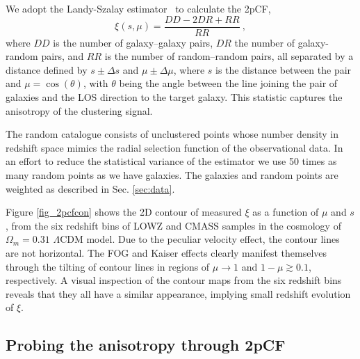 \documentclass[iop]{emulateapj}
\begin{document}
We adopt the Landy-Szalay estimator~\citep{1993ApJ...412...64L} to calculate the 2pCF,
\begin{equation}
\xi(s,\mu)=\frac{DD-2DR+RR}{RR}\ ,
\end{equation}
where $DD$ is the number of galaxy--galaxy pairs, 
$DR$ the number of galaxy-random pairs, 
and $RR$ is the number of random--random pairs, 
all separated by a distance defined by $s\pm\Delta s$ and $\mu\pm\Delta\mu$, 
where $s$ is the distance between the pair and $\mu=\cos(\theta)$, 
with $\theta$ being the angle between the line joining the pair of galaxies and the LOS direction to the target galaxy. 
This statistic captures the anisotropy of the clustering signal.

The random catalogue consists of unclustered points whose number density in redshift space mimics the radial selection function of the observational data. 
In an effort to reduce the statistical variance of the estimator we use 50 times as many random points as we have galaxies.
The galaxies and random points are weighted as described in Sec. \ref{sec:data}.

Figure \ref{fig_2pcfcon} shows the 2D contour of measured $\xi$ as a function of $\mu$ and $s$,
from the six redshift bins of LOWZ and CMASS samples 
in the cosmology of $\Omega_m=0.31$ $\Lambda$CDM model.
Due to the peculiar velocity effect, the contour lines are not horizontal.
The FOG \citep{FOG} and Kaiser \citep{Kaiser1987} effects 
clearly manifest themselves through the tilting of contour lines in regions of $\mu \rightarrow 1$ and $1-\mu \gtrsim0.1$, respectively.
A visual inspection of the contour maps from the six redshift bins 
reveals that they all have a similar appearance,
implying small redshift evolution of $\xi$.

\subsection{Probing the anisotropy through 2pCF}
\end{document}
